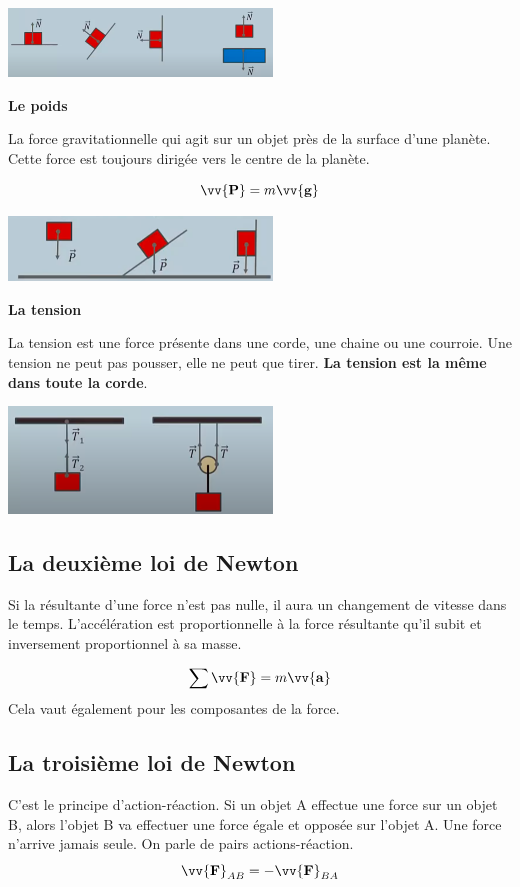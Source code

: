 \documentclass{article}
\begin{document}
 \includegraphics[width=7cm]{Image/Normal.png}
\newline

\noindent
\textbf{Le poids}
\newline

\noindent
La force gravitationnelle qui agit sur un objet près de la surface d'une planète. Cette force est toujours dirigée vers le centre de la planète.

\[\vv{\mathbf{P}} = m\vv{\mathbf{g}}\]

 \includegraphics[width=7cm]{Image/Poids.png}
\newline

\noindent
\textbf{La tension}
\newline

\noindent
La tension est une force présente dans une corde, une chaine ou une courroie. Une tension ne peut pas pousser, elle ne peut que tirer. \textbf{La tension est la même dans toute la corde}.

 \includegraphics[width=7cm]{Image/Tention.png}
 
 \subsection{La deuxième loi de Newton}
 Si la résultante d'une force n'est pas nulle, il aura un changement de vitesse dans le temps.
 \newline
 L'accélération est proportionnelle à la force résultante qu'il subit et inversement proportionnel à sa masse.
 
 \[\sum \vv{\mathbf{F}} = m\vv{\mathbf{a}}\]
 Cela vaut également pour les composantes de la force.
 
 \subsection{La troisième loi de Newton}
 C'est le principe d'action-réaction.
\newline
Si un objet A effectue une force sur un objet B, alors l'objet B va effectuer une force égale et opposée sur l'objet A. Une force n'arrive jamais seule. On parle de pairs actions-réaction.
\[\vv{\mathbf{F}}_{AB} = -\vv{\mathbf{F}}_{BA}\]
\newline
\end{document}

